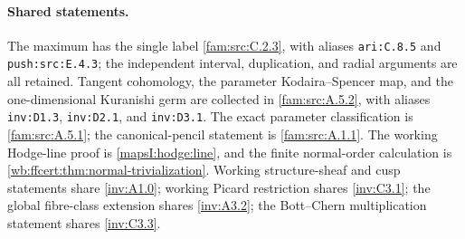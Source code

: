 \paragraph{Shared statements.}
The maximum has the single label \cref{fam:src:C.2.3}, with aliases
\texttt{ari:C.8.5} and \texttt{push:src:E.4.3}; the independent
interval, duplication, and radial arguments are all retained.
Tangent cohomology, the parameter Kodaira--Spencer map, and the
one-dimensional Kuranishi germ are collected in
\cref{fam:src:A.5.2}, with aliases
\texttt{inv:D1.3}, \texttt{inv:D2.1}, and \texttt{inv:D3.1}.
The exact parameter classification is \cref{fam:src:A.5.1};
the canonical-pencil statement is \cref{fam:src:A.1.1}.
The working Hodge-line proof is \cref{mapsI:hodge:line},
and the finite normal-order calculation is
\cref{wb:ffcert:thm:normal-trivialization}.
Working structure-sheaf and cusp statements share \cref{inv:A1.0};
working Picard restriction shares \cref{inv:C3.1};
the global fibre-class extension shares \cref{inv:A3.2};
the Bott--Chern multiplication statement shares \cref{inv:C3.3}.
